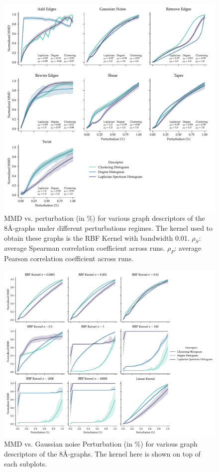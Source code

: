 \begin{figure}
  \centering
  \includegraphics[width=\textwidth]{./figures/results/res_1_1.pdf}
  \caption{MMD vs. perturbation (in \%) for various graph descriptors of the 8\si{\angstrom}-graphs under different perturbations regimes. The kernel
    used to obtain these graphs is the RBF Kernel with bandwidth 0.01.
    $\rho_{S}$: average Spearman correlation coefficient across runs.
    $\rho_{P}$: average Pearson correlation coefficient across runs.}
  \label{fig:mmd_consistent_eps}
\end{figure}


\begin{figure}
  \centering
  \includegraphics[width=\textwidth]{./figures/results/res_1_2.pdf}
  \caption{MMD vs. Gaussian noise Perturbation (in \%) for various graph descriptors of the
    8\si{\angstrom}-graphs. The kernel here is shown on top of each subplots.}
  \label{fig:mmd_effect_kernel}
\end{figure}

